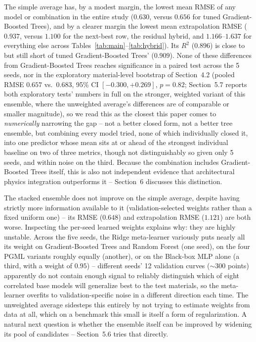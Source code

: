 \documentclass[11pt]{article}
\begin{document}
The simple average has, by a modest margin, the lowest mean RMSE of any model or combination in the entire study ($0.630$, versus $0.656$ for tuned Gradient-Boosted Trees), and by a clearer margin the lowest mean extrapolation RMSE ($0.937$, versus $1.100$ for the next-best row, the residual hybrid, and $1.166$--$1.637$ for everything else across Tables~\ref{tab:main}--\ref{tab:hybrid}). Its $R^2$ ($0.896$) is close to but still short of tuned Gradient-Boosted Trees' ($0.909$). None of these differences from Gradient-Boosted Trees reaches significance in a paired test across the 5 seeds, nor in the exploratory material-level bootstrap of Section~4.2 (pooled RMSE $0.657$ vs.\ $0.683$, 95\% CI $[-0.300, +0.269]$, $p = 0.82$; Section~5.7 reports both exploratory tests' numbers in full on the stronger, weighted variant of this ensemble, where the unweighted average's differences are of comparable or smaller magnitude), so we read this as the closest this paper comes to \emph{numerically} narrowing the gap -- not a better closed form, not a better tree ensemble, but combining every model tried, none of which individually closed it, into one predictor whose mean sits at or ahead of the strongest individual baseline on two of three metrics, though not distinguishably so given only 5 seeds, and within noise on the third. Because the combination includes Gradient-Boosted Trees itself, this is also not independent evidence that architectural physics integration outperforms it -- Section~6 discusses this distinction.

The stacked ensemble does not improve on the simple average, despite having strictly more information available to it (validation-selected weights rather than a fixed uniform one) -- its RMSE ($0.648$) and extrapolation RMSE ($1.121$) are both worse. Inspecting the per-seed learned weights explains why: they are highly unstable. Across the five seeds, the Ridge meta-learner variously puts nearly all its weight on Gradient-Boosted Trees and Random Forest (one seed), on the four PGML variants roughly equally (another), or on the Black-box MLP alone (a third, with a weight of $0.95$) -- different seeds' 12 validation curves ($\sim$300 points) apparently do not contain enough signal to reliably distinguish which of eight correlated base models will generalize best to the test materials, so the meta-learner overfits to validation-specific noise in a different direction each time. The unweighted average sidesteps this entirely by not trying to estimate weights from data at all, which on a benchmark this small is itself a form of regularization. A natural next question is whether the ensemble itself can be improved by widening its pool of candidates -- Section~5.6 tries that directly.
\end{document}
